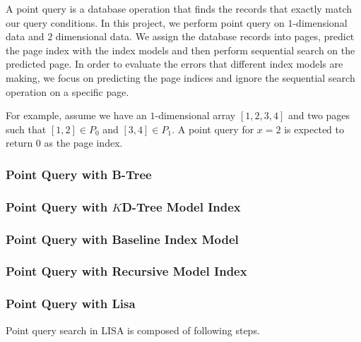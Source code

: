 A point query is a database operation that finds the records that exactly match our query conditions. In this project, we perform point query on $1$-dimensional data and $2$ dimensional data. We assign the database records into pages, predict the page index with the index models and then perform sequential search on the predicted page. In order to evaluate the errors that different index models are making, we focus on predicting the page indices and ignore the sequential search operation on a specific page. 

\begin{mscexample}
For example, assume we have an $1$-dimensional array $[1,2,3,4]$ and two pages such that $[1,2]\in P_0$ and $[3,4]\in P_1$. A point query for $x=2$ is expected to return 0 as the page index.
\end{mscexample}

\subsubsection{Point Query with B-Tree}



\subsubsection{Point Query with $K$D-Tree Model Index}



\subsubsection{Point Query with Baseline Index Model}



\subsubsection{Point Query with Recursive Model Index}



\subsubsection{Point Query with Lisa}
Point query search in LISA is composed of following steps.

